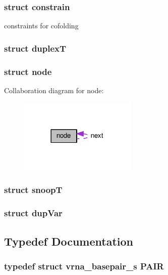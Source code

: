 \subsubsection{struct constrain}
constraints for cofolding \label{structduplexT}
\hypertarget{group__data__structures_structduplexT}{}
\subsubsection{struct duplex\-T}
\label{structnode}
\hypertarget{group__data__structures_structnode}{}
\subsubsection{struct node}


Collaboration diagram for node\-:
\nopagebreak
\begin{figure}[H]
\begin{center}
\leavevmode
\includegraphics[width=158pt]{structnode__coll__graph}
\end{center}
\end{figure}
\label{structsnoopT}
\hypertarget{group__data__structures_structsnoopT}{}
\subsubsection{struct snoop\-T}
\label{structdupVar}
\hypertarget{group__data__structures_structdupVar}{}
\subsubsection{struct dup\-Var}


\subsection{Typedef Documentation}
\hypertarget{group__data__structures_ga4381025ffbd692e54189b2c679c79c99}{
\subsubsection[{P\-A\-I\-R}]{\setlength{\rightskip}{0pt plus 5cm}typedef struct {\bf vrna\-\_\-basepair\-\_\-s} {\bf P\-A\-I\-R}}}\label{group__data__structures_ga4381025ffbd692e54189b2c679c79c99}


